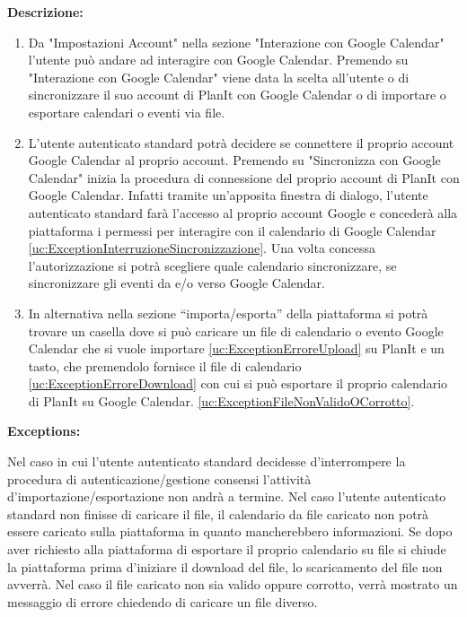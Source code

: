 \begin{listaPersonale}[UC]{}
\begin{listaPersonale2}[UC] {}
        \textbf{Descrizione:}
        \begin{enumerate}
            \item Da "Impostazioni Account" nella sezione "Interazione con Google Calendar" l'utente può andare ad interagire con Google Calendar. Premendo su "Interazione con Google Calendar" viene data la scelta all'utente o di sincronizzare il suo account di PlanIt con Google Calendar o di importare o esportare calendari o eventi via file.
            \item L'utente autenticato standard potrà decidere se connettere il proprio account Google Calendar al proprio account. Premendo su "Sincronizza con Google Calendar" inizia la procedura di connessione del proprio account di PlanIt con Google Calendar. Infatti tramite un'apposita finestra di dialogo, l'utente autenticato standard farà l'accesso al proprio account Google e concederà alla piattaforma i permessi per interagire con il calendario di Google Calendar \ref{uc:ExceptionInterruzioneSincronizzazione}. Una volta concessa l'autorizzazione si potrà scegliere quale calendario sincronizzare, se sincronizzare gli eventi da e/o verso Google Calendar.
            \item In alternativa nella sezione “importa/esporta” della piattaforma si potrà trovare un casella dove si può caricare un file di calendario o evento Google Calendar che si vuole importare \ref{uc:ExceptionErroreUpload} su PlanIt e un tasto, che premendolo fornisce il file di calendario \ref{uc:ExceptionErroreDownload} con cui si può esportare il proprio calendario di PlanIt su Google Calendar. \ref{uc:ExceptionFileNonValidoOCorrotto}.
        \end{enumerate}

        \textbf{Exceptions:}
        \begin{enumerate}[label=\textbf{[exception \arabic{enumiii}]}, ref= \textbf{[exception \arabic{enumiii}]}]
             Nel caso in cui l'utente autenticato standard decidesse d'interrompere la procedura di autenticazione/gestione consensi l'attività d'importazione/esportazione non andrà a termine.
             Nel caso l'utente autenticato standard non finisse di caricare il file, il calendario da file caricato non potrà essere caricato sulla piattaforma in quanto mancherebbero informazioni.
             Se dopo aver richiesto alla piattaforma di esportare il proprio calendario su file si chiude la piattaforma prima d'iniziare il download del file, lo scaricamento del file non avverrà.
             Nel caso il file caricato non sia valido oppure corrotto, verrà mostrato un messaggio di errore chiedendo di caricare un file diverso.
        \end{enumerate}


\end{listaPersonale2}
\end{listaPersonale}
